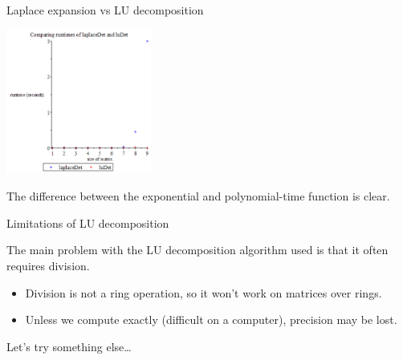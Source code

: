 \documentclass{beamer}
\begin{document}
\begin{frame}{Laplace expansion vs LU decomposition}

    \begin{center}{}
        \includegraphics[height=180]{laplace-lu}
    \end{center}

    The difference between the exponential and polynomial-time function is clear.
\end{frame}


\begin{frame}{Limitations of LU decomposition}

    The main problem with the LU decomposition algorithm used is that it often requires division.

    \begin{itemize}
        \pause{}
        \item Division is not a ring operation, so it won't work on matrices over rings.
        \pause{}
        \item Unless we compute exactly (difficult on a computer), precision may be lost.
    \end{itemize}

    \pause{}
    Let's try something else\dots

\end{frame}
\end{document}
